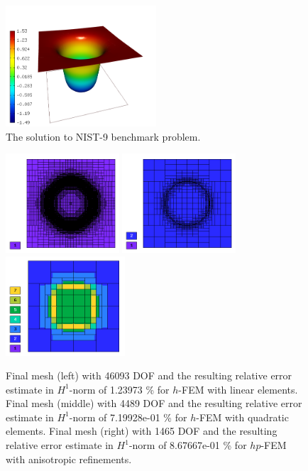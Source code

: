 \documentclass[12pt]{elsarticle}
\begin{document}
\begin{figure}[!ht]
\centering
\vspace{-5mm}
\includegraphics[height=4.5cm]{nist/nist-9/solution.png}
\vspace{-3mm}
\caption{The solution to NIST-9 benchmark problem.}
\label{fig:sln-nist09}
\end{figure}

\begin{figure}[!ht]
\centering
\vspace{-5mm}
\includegraphics[height=3.7cm]{nist/nist-9/mesh_h1_aniso.png}
\includegraphics[height=3.7cm]{nist/nist-9/mesh_h2_aniso.png}
\includegraphics[height=3.7cm]{nist/nist-9/mesh_hp_aniso.png}
\vspace{-3mm}
\caption{
Final mesh (left) with 46093 DOF and the resulting
relative error estimate in $H^1$-norm of 1.23973 \% for $h$-FEM with linear elements.
Final mesh (middle) with 4489 DOF and the resulting
relative error estimate in $H^1$-norm of 7.19928e-01 \% for $h$-FEM with quadratic elements.
Final mesh (right) with 1465 DOF and the resulting
relative error estimate in $H^1$-norm of 8.67667e-01 \% for $hp$-FEM with anisotropic refinements.}
\label{fig:nist-9-hp-aniso}
\end{figure}
\end{document}

